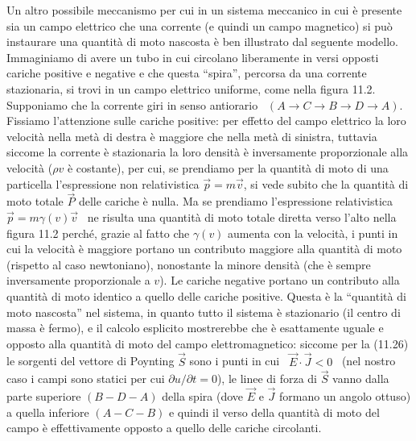 Un altro possibile meccanismo per cui in un sistema meccanico in cui \`e
presente sia un campo elettrico che una corrente (e quindi un campo magnetico)
si pu\`o instaurare una quantit\`a di moto nascosta \`e ben illustrato dal
seguente modello.\\
Immaginiamo di avere un tubo in cui circolano liberamente in versi opposti
cariche positive e negative e che questa ``spira'', percorsa da una corrente
stazionaria, si trovi in un campo elettrico uniforme, come nella figura 11.2.
Supponiamo che la corrente giri in senso antiorario \ $(A\to C\to B\to D\to A)$.
Fissiamo l'attenzione sulle cariche positive: per effetto del campo elettrico la
loro velocit\`a nella met\`a di destra \`e maggiore che nella met\`a di
sinistra, tuttavia siccome la corrente \`e stazionaria la loro densit\`a \`e
inversamente proporzionale alla velocit\`a ($\rho v$ \`e costante), per cui, se
prendiamo per la quantit\`a di moto di una particella l'espressione non
relativistica $\vec p=m\vec v$, si vede subito che la quantit\`a di moto totale
$\vec P$ delle cariche \`e nulla. Ma se prendiamo l'espressione relativistica
\ $\vec p=m\gamma(v)\vec v$ \ ne risulta una quantit\`a di moto totale diretta
verso l'alto nella figura 11.2 perch\'e, grazie al fatto che $\gamma(v)$ aumenta
con la velocit\`a, i punti in cui la velocit\`a \`e maggiore portano un
contributo maggiore alla quantit\`a di moto (rispetto al caso newtoniano),
nonostante la minore densit\`a (che \`e sempre inversamente proporzionale a
$v$). Le cariche negative portano un contributo alla quantit\`a di moto identico
a quello delle cariche positive. Questa \`e la ``quantit\`a di moto nascosta''
nel sistema, in quanto tutto il sistema \`e stazionario (il centro di massa \`e
fermo), e il calcolo esplicito mostrerebbe che \`e esattamente uguale e opposto
alla quantit\`a di moto del campo elettromagnetico: siccome per la (11.26) le
sorgenti del vettore di Poynting $\vec S$ sono i punti in cui
\ $\vec E\cdot\vec J<0$ \ (nel nostro caso i campi sono statici per cui
$\partial u/\partial t=0$), le linee di forza di $\vec S$ vanno dalla parte
superiore $(B-D-A)$ della spira (dove $\vec E$ e $\vec J$ formano un angolo
ottuso) a quella inferiore $(A-C-B)$ e quindi il verso della quantit\`a di moto
del campo \`e effettivamente opposto a quello delle cariche circolanti.

